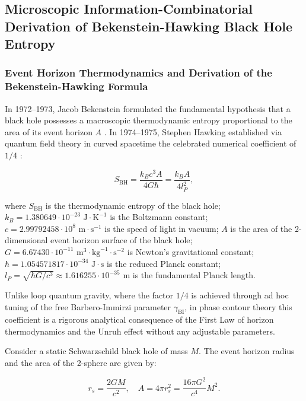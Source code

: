 \documentclass[11pt,a4paper]{article}
\theoremstyle{definition}
\begin{document}
\subsection{Microscopic Information-Combinatorial Derivation of Bekenstein-Hawking Black Hole Entropy}\label{sec:2.6}

\subsubsection{Event Horizon Thermodynamics and Derivation of the Bekenstein-Hawking Formula}\label{sec:2.6.1}

In 1972--1973, Jacob Bekenstein formulated the fundamental hypothesis that a black hole possesses a macroscopic thermodynamic entropy proportional to the area of its event horizon $A$ \cite{ref19}. In 1974--1975, Stephen Hawking established via quantum field theory in curved spacetime the celebrated numerical coefficient of $1/4$ \cite{ref18}:

\begin{equation}\label{eq:2.56}\tag{2.56}
S_{\text{BH}} = \frac{k_B c^3 A}{4 G \hbar} = \frac{k_B A}{4 l_P^2},
\end{equation}

where $S_{\text{BH}}$ is the thermodynamic entropy of the black hole;  
$k_B = 1.380649 \cdot 10^{-23}\text{ J}\cdot\text{K}^{-1}$ is the Boltzmann constant;  
$c = 2.99792458 \cdot 10^8\text{ m}\cdot\text{s}^{-1}$ is the speed of light in vacuum;  
$A$ is the area of the 2-dimensional event horizon surface of the black hole;  
$G = 6.67430 \cdot 10^{-11}\text{ m}^3\cdot\text{kg}^{-1}\cdot\text{s}^{-2}$ is Newton's gravitational constant;  
$\hbar = 1.054571817 \cdot 10^{-34}\text{ J}\cdot\text{s}$ is the reduced Planck constant;  
$l_P = \sqrt{\hbar G / c^3} \approx 1.616255 \cdot 10^{-35}\text{ m}$ is the fundamental Planck length.

Unlike loop quantum gravity, where the factor $1/4$ is achieved through ad hoc tuning of the free Barbero-Immirzi parameter $\gamma_{\text{BI}}$, in phase contour theory this coefficient is a rigorous analytical consequence of the First Law of horizon thermodynamics and the Unruh effect without any adjustable parameters.

Consider a static Schwarzschild black hole of mass $M$. The event horizon radius and the area of the 2-sphere are given by:

\begin{equation}\label{eq:2.57}\tag{2.57}
r_s = \frac{2GM}{c^2}, \quad A = 4\pi r_s^2 = \frac{16\pi G^2}{c^4} M^2.
\end{equation}
\end{document}
